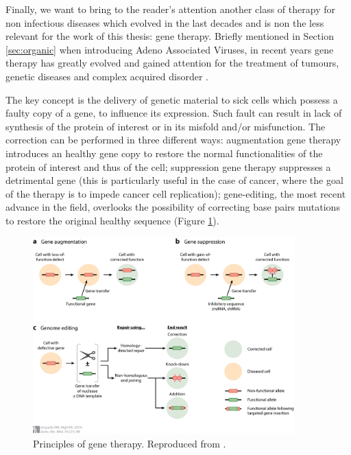 Finally, we want to bring to the reader's attention another class of therapy for non infectious diseases which evolved in the last decades and is non the less relevant for the work of this thesis: gene therapy. Briefly mentioned in Section \ref{sec:organic} when introducing Adeno Associated Viruses, in recent years gene therapy has greatly evolved and gained attention for the treatment of tumours, genetic diseases and complex acquired disorder \cite{Anguela2019}.

The key concept is the delivery of genetic material to sick cells which possess a faulty copy of a gene, to influence its expression. Such fault can result in lack of synthesis of the protein of interest or in its misfold and/or misfunction. The correction can be performed in three different ways: augmentation gene therapy introduces an healthy gene copy to restore the normal functionalities of the protein of interest and thus of the cell; suppression gene therapy suppresses a detrimental gene (this is particularly useful in the case of cancer, where the goal of the therapy is to impede cancer cell replication); gene-editing, the most recent advance in the field, overlooks the possibility of correcting base pairs mutations to restore the original healthy sequence (Figure \ref{fig:gene_therapy}).

\begin{figure}
\begin{center}
\includegraphics[width = 0.9\textwidth]{pics/gene_therapy.jpeg}
\caption[Principles of gene therapy]{Principles of gene therapy. Reproduced from \cite{Anguela2019}.} \label{fig:gene_therapy}
\end{center}
\end{figure}

